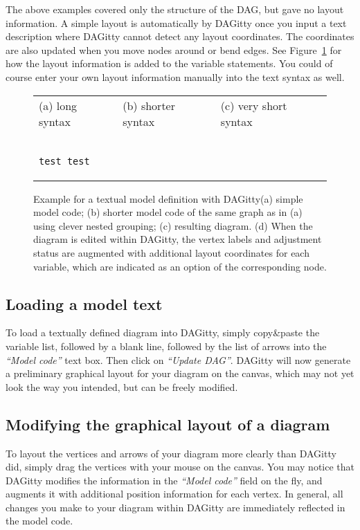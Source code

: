 \documentclass[a4paper]{article} %
\makeatletter
\newcommand{\pp}{{\sc DAG}itty\xspace}
\newcommand{\action}[1]{\emph{``#1''}}
\newenvironment{kframe}{%
 \def\at@end@of@kframe{}%
 \ifinner\ifhmode%
  \def\at@end@of@kframe{\end{minipage}}%
  \begin{minipage}{\columnwidth}%
 \fi\fi%
 \def\FrameCommand##1{\hskip\@totalleftmargin \hskip-\fboxsep
 \colorbox{shadecolor}{##1}\hskip-\fboxsep
     \hskip-\linewidth \hskip-\@totalleftmargin \hskip\columnwidth}%
 \MakeFramed {\advance\hsize-\width
   \@totalleftmargin\z@ \linewidth\hsize
   \@setminipage}}%
 {\par\unskip\endMakeFramed%
 \at@end@of@kframe}
\newenvironment{dagcode}{%
\begin{kframe}
\begin{verbatim}
}{
\end{verbatim}
\end{kframe}
}
\makeatother
\begin{document}
The above examples covered only the structure of the DAG, but gave no layout information. A simple layout is automatically by \pp once you input a text description where \pp cannot detect any layout coordinates. The coordinates are also updated when you move nodes around or bend edges. See Figure~\ref{fig:syntax} for how the layout information is added to the variable statements. You could of course enter your own layout information manually into the text syntax as well.
\begin{figure}
\begin{tabular}{lll}
(a) long syntax & (b) shorter syntax & (c) very short syntax \\
\begin{dagcode}
test test 
\end{dagcode}
\end{tabular}
\caption{
Example for a textual model definition with \pp (a) simple model code; (b) shorter model code of the same graph as in (a) using clever nested grouping; (c) resulting diagram. (d) When the diagram is edited within \pp, the vertex labels and adjustment status are augmented with additional layout coordinates for each variable, which are indicated as an option of the corresponding node.
}
\label{fig:syntax}
\end{figure}


\subsection{Loading a model text}

To load a textually defined diagram into \pp, simply copy\&paste the 
variable list, followed by a blank line,
followed by the list of arrows into the \action{Model code} text
box. Then click on \action{Update DAG}.
\pp will now generate a preliminary graphical layout for your diagram on 
the canvas, which may not yet look the way you intended, but can be freely 
modified.

\subsection{Modifying the graphical layout of a diagram}

To layout the vertices and arrows of your diagram more clearly than \pp
did, simply drag the vertices with your mouse on the canvas. You may notice
that \pp modifies the information in the \action{Model code} field
on the fly, and augments it with additional position information for each
vertex. In general, all changes you make to your diagram within \pp 
are immediately reflected in the model code. 
\end{document}
